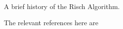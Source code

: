 A brief history of the Risch Algorithm.

The relevant references here are~\cite{moses1971symbolic,risch1969problem}
